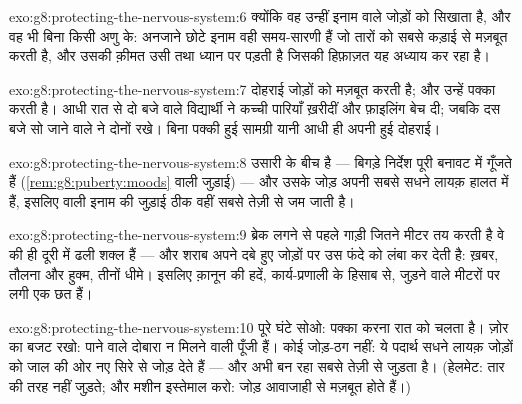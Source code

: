 \begin{solution}{exo:g8:protecting-the-nervous-system:6}
क्योंकि वह उन्हीं इनाम वाले जोड़ों को सिखाता है, और वह भी बिना किसी अणु
के: अनजाने छोटे इनाम वही समय-सारणी हैं जो तारों को सबसे कड़ाई से मज़बूत
करती है, और उसकी क़ीमत उसी  तथा ध्यान पर पड़ती है जिसकी हिफ़ाज़त यह
अध्याय कर रहा है।
\end{solution}

\begin{solution}{exo:g8:protecting-the-nervous-system:7}
दोहराई जोड़ों को मज़बूत करती है; और  उन्हें पक्का करती है। आधी रात
से दो बजे वाले विद्यार्थी ने कच्ची पारियाँ ख़रीदीं और फ़ाइलिंग बेच दी;
जबकि दस बजे सो जाने वाले ने दोनों रखे। बिना पक्की हुई सामग्री यानी आधी
ही अपनी हुई दोहराई।
\end{solution}

\begin{solution}{exo:g8:protecting-the-nervous-system:8}
  उसारी के बीच है --- बिगड़े निर्देश पूरी बनावट में गूँजते
हैं (\cref{rem:g8:puberty:moods} वाली जुड़ाई) --- और उसके जोड़ अपनी सबसे
सधने लायक़ हालत में हैं, इसलिए  वाली इनाम की जुड़ाई ठीक वहीं सबसे तेज़ी
से जम जाती है।
\end{solution}

\begin{solution}{exo:g8:protecting-the-nervous-system:9}
ब्रेक लगने से पहले गाड़ी जितने मीटर तय करती है वे  की ही
दूरी में ढली शक्ल हैं --- और शराब अपने दबे हुए जोड़ों पर उस फंदे को लंबा
कर देती है: ख़बर, तौलना और हुक्म, तीनों धीमे। इसलिए क़ानून की हदें,
कार्य-प्रणाली के हिसाब से, जुड़ने वाले मीटरों पर लगी एक छत हैं।
\end{solution}

\begin{solution}{exo:g8:protecting-the-nervous-system:10}
पूरे घंटे सोओ: पक्का करना रात को चलता है। ज़ोर का बजट रखो: पाने वाले
दोबारा न मिलने वाली पूँजी हैं। कोई जोड़-ठग नहीं: ये पदार्थ सधने लायक़
जोड़ों को जाल की ओर नए सिरे से जोड़ देते हैं --- और अभी बन रहा 
सबसे तेज़ी से जुड़ता है। (हेलमेट: तार  की तरह नहीं जुड़ते; और मशीन
इस्तेमाल करो: जोड़ आवाजाही से मज़बूत होते हैं।)
\end{solution}

